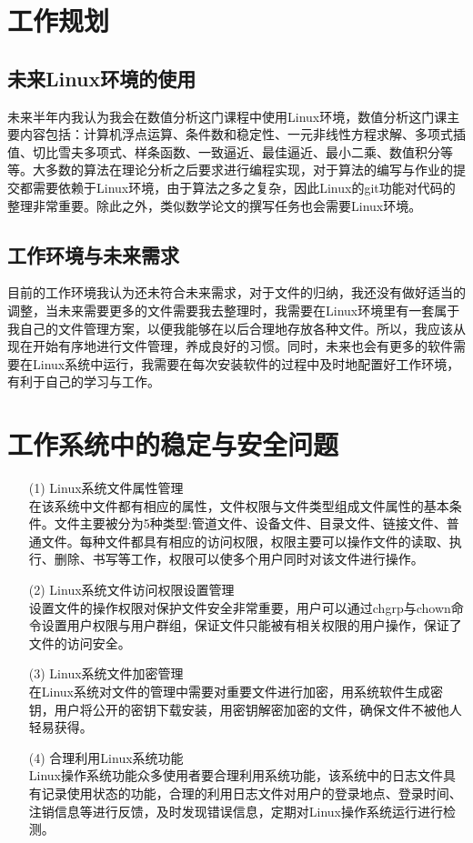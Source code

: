 \documentclass[hyperref,UTF8]{ctexart}
\begin{document}
	\section{工作规划}
	\subsection{未来Linux环境的使用}
	未来半年内我认为我会在数值分析这门课程中使用Linux环境，数值分析这门课主要内容包括：计算机浮点运算、条件数和稳定性、一元非线性方程求解、多项式插值、切比雪夫多项式、样条函数、一致逼近、最佳逼近、最小二乘、数值积分等等。大多数的算法在理论分析之后要求进行编程实现，对于算法的编写与作业的提交都需要依赖于Linux环境，由于算法之多之复杂，因此Linux的git功能对代码的整理非常重要。除此之外，类似数学论文的撰写任务也会需要Linux环境。
	\subsection{工作环境与未来需求}
	目前的工作环境我认为还未符合未来需求，对于文件的归纳，我还没有做好适当的调整，当未来需要更多的文件需要我去整理时，我需要在Linux环境里有一套属于我自己的文件管理方案，以便我能够在以后合理地存放各种文件。所以，我应该从现在开始有序地进行文件管理，养成良好的习惯。同时，未来也会有更多的软件需要在Linux系统中运行，我需要在每次安装软件的过程中及时地配置好工作环境，有利于自己的学习与工作。
	\section{工作系统中的稳定与安全问题}
	\begin{itemize}
		\item[(1)] Linux系统文件属性管理\\
		在该系统中文件都有相应的属性，文件权限与文件类型组成文件属性的基本条件。文件主要被分为5种类型:管道文件、设备文件、目录文件、链接文件、普通文件。每种文件都具有相应的访问权限，权限主要可以操作文件的读取、执行、删除、书写等工作，权限可以使多个用户同时对该文件进行操作。
		\item[(2)] Linux系统文件访问权限设置管理\\
		设置文件的操作权限对保护文件安全非常重要，用户可以通过chgrp与chown命令设置用户权限与用户群组，保证文件只能被有相关权限的用户操作，保证了文件的访问安全。
		\item[(3)] Linux系统文件加密管理\\
		在Linux系统对文件的管理中需要对重要文件进行加密，用系统软件生成密钥，用户将公开的密钥下载安装，用密钥解密加密的文件，确保文件不被他人轻易获得。
		\item[(4)] 合理利用Linux系统功能\\
		Linux操作系统功能众多使用者要合理利用系统功能，该系统中的日志文件具有记录使用状态的功能，合理的利用日志文件对用户的登录地点、登录时间、注销信息等进行反馈，及时发现错误信息，定期对Linux操作系统运行进行检测。\cite{张旭红2015linux}
	\end{itemize}
	
	
	
	
	
	
	
\end{document}
